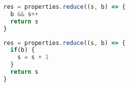 \begin{figure*}[thb]
\noindent\begin{minipage}{.45\textwidth}  
\begin{lstlisting}[language=JavaScript]
res = properties.reduce((s, b) => {
  b && s++
  return s
}
\end{lstlisting}
\end{minipage}\hfill
\begin{minipage}{.45\textwidth}
\begin{lstlisting}[language=JavaScript]
res = properties.reduce((s, b) => {
  if(b) {
    s = s + 1
  }
  return s
}
\end{lstlisting}
\end{minipage}
\label{fig:lst01}
\end{figure*}


